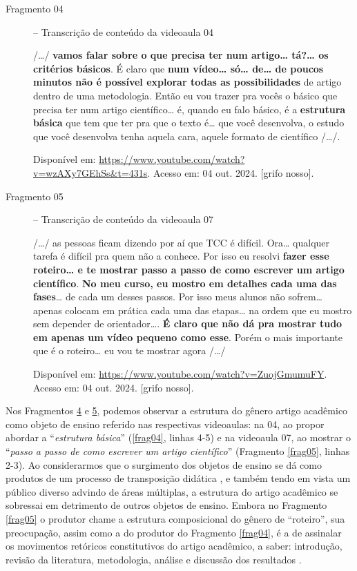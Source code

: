 \begin{description}
    \item[Fragmento 04\label{frag04}] -- Transcrição de conteúdo da videoaula 04

/\ldots/ \textbf{vamos falar sobre o que precisa ter num artigo\ldots{}
tá?\ldots{} os critérios básicos}. É claro que \textbf{num vídeo\ldots{}
só\ldots{} de\ldots{} de poucos minutos não é possível explorar todas as
possibilidades} de artigo dentro de uma metodologia. Então eu vou trazer
pra vocês o básico que precisa ter num artigo científico\ldots{} é,
quando eu falo básico, é a \textbf{estrutura básica} que tem que ter pra
que o texto é\ldots{} que você desenvolva, o estudo que você desenvolva
tenha aquela cara, aquele formato de científico /\ldots/.

Disponível em:
\url{https://www.youtube.com/watch?v=wzAXy7GEhSs\&t=431s}.
Acesso em: 04 out. 2024. {[}grifo nosso{]}.

    \item[Fragmento 05\label{frag05}] -- Transcrição de conteúdo da videoaula 07

/\ldots/ as pessoas ficam dizendo por aí que TCC é difícil. Ora\ldots{}
qualquer tarefa é difícil pra quem não a conhece. Por isso eu resolvi
\textbf{fazer esse roteiro\ldots{} e te mostrar passo a passo de como
escrever um artigo científico}. \textbf{No meu curso, eu mostro em
detalhes cada uma das fases}\ldots{} de cada um desses passos. Por isso
meus alunos não sofrem\ldots{} apenas colocam em prática cada uma das
etapas\ldots{} na ordem que eu mostro sem depender de orientador\ldots.
\textbf{É claro que não dá pra mostrar tudo em apenas um vídeo pequeno
como esse}. Porém o mais importante que é o roteiro\ldots{} eu vou te
mostrar agora /\ldots/

Disponível em:
\url{https://www.youtube.com/watch?v=ZuojGmumuFY}.
Acesso em: 04 out. 2024. {[}grifo nosso{]}.
\end{description}

Nos Fragmentos \hyperref[frag04]{4} e \hyperref[frag05]{5}, podemos observar a estrutura do gênero artigo
acadêmico como objeto de ensino referido nas respectivas videoaulas: na
04, ao propor abordar a ``\emph{estrutura básica}'' (\ref{frag04},
linhas 4-5) e na videoaula 07, ao mostrar o ``\emph{passo a passo de
como escrever um artigo científico}'' (Fragmento \ref{frag05}, linhas 2-3). Ao
considerarmos que o surgimento dos objetos de ensino se dá como produtos
de um processo de transposição didática \cite{linodearaujo2014}, e também
tendo em vista um público diverso advindo de áreas múltiplas, a
estrutura do artigo acadêmico se sobressai em detrimento de outros
objetos de ensino. Embora no Fragmento \ref{frag05} o produtor chame a estrutura
composicional do gênero de ``roteiro'', sua preocupação, assim como a do
produtor do Fragmento \ref{frag04}, é a de assinalar os movimentos retóricos
constitutivos do artigo acadêmico, a saber: introdução, revisão da
literatura, metodologia, análise e discussão dos resultados \cite{motta-roth2010}.

